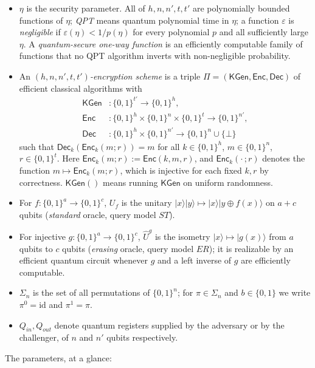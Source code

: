 \documentclass{aicr-conjecture}
\newcommand{\KGen}{\mathsf{KGen}}
\newcommand{\Enc}{\mathsf{Enc}}
\newcommand{\Dec}{\mathsf{Dec}}
\newcommand{\ket}[1]{|#1\rangle}
\begin{document}
\begin{itemize}
  \item $\eta$ is the security parameter. All of $h,n,n',t,t'$ are
    polynomially bounded functions of $\eta$; \emph{QPT} means quantum
    polynomial time in $\eta$; a function $\varepsilon$ is
    \emph{negligible} if $\varepsilon(\eta)<1/p(\eta)$ for every
    polynomial $p$ and all sufficiently large $\eta$. A
    \emph{quantum-secure one-way function} is an efficiently computable
    family of functions that no QPT algorithm inverts with
    non-negligible probability.
  \item An \emph{$(h,n,n',t,t')$-encryption scheme} is a triple
    $\Pi=(\KGen,\Enc,\Dec)$ of efficient classical algorithms with
    \begin{align*}
      \KGen&\colon\{0,1\}^{t'}\to\{0,1\}^{h},\\
      \Enc&\colon\{0,1\}^{h}\times\{0,1\}^{n}\times\{0,1\}^{t}
        \to\{0,1\}^{n'},\\
      \Dec&\colon\{0,1\}^{h}\times\{0,1\}^{n'}
        \to\{0,1\}^{n}\cup\{\bot\}
    \end{align*}
    such that $\Dec_k(\Enc_k(m;r))=m$ for all $k\in\{0,1\}^h$,
    $m\in\{0,1\}^n$, $r\in\{0,1\}^t$. Here $\Enc_k(m;r):=\Enc(k,m,r)$,
    and $\Enc_k(\cdot\,;r)$ denotes the function
    $m\mapsto\Enc_k(m;r)$, which is injective for each fixed $k,r$ by
    correctness. $\KGen()$ means running $\KGen$ on uniform randomness.
  \item For $f:\{0,1\}^{a}\to\{0,1\}^{c}$, $U_f$ is the unitary
    $\ket{x}\ket{y}\mapsto\ket{x}\ket{y\oplus f(x)}$ on $a+c$ qubits
    (\emph{standard} oracle, query model $ST$).
  \item For injective $g:\{0,1\}^{a}\to\{0,1\}^{c}$, $\hat U^{g}$ is
    the isometry $\ket{x}\mapsto\ket{g(x)}$ from $a$ qubits to $c$
    qubits (\emph{erasing} oracle, query model $ER$); it is realizable
    by an efficient quantum circuit whenever $g$ and a left inverse of
    $g$ are efficiently computable.
  \item $\Sigma_n$ is the set of all permutations of $\{0,1\}^{n}$; for
    $\pi\in\Sigma_n$ and $b\in\{0,1\}$ we write $\pi^{0}=\mathrm{id}$
    and $\pi^{1}=\pi$.
  \item $Q_{in},Q_{out}$ denote quantum registers supplied by the
    adversary or by the challenger, of $n$ and $n'$ qubits
    respectively.
\end{itemize}

The parameters, at a glance:
\end{document}
